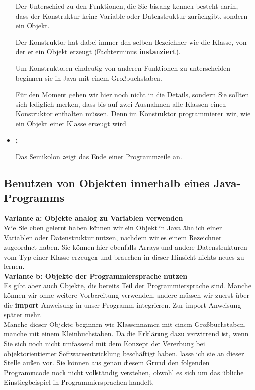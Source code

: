 \begin{itemize}
	Der Unterschied zu den Funktionen, die Sie bislang kennen besteht darin, dass der Konstruktur keine Variable oder Datenstruktur zurückgibt, sondern ein Objekt.
	
	Der Konstruktor hat dabei immer den selben Bezeichner wie die Klasse, von der er ein Objekt erzeugt (Fachterminus \textbf{instanziert}).
	
	Um Konstruktoren eindeutig von anderen Funktionen zu unterscheiden beginnen sie in Java mit einem Großbuchstaben.
	
	Für den Moment gehen wir hier noch nicht in die Details, sondern Sie sollten sich lediglich merken, dass bis auf zwei Ausnahmen alle Klassen einen Konstruktor enthalten müssen. Denn im Konstruktor programmieren wir, wie ein Objekt einer Klasse erzeugt wird.
	
	\item \textbf{;}
	
	Das Semikolon zeigt das Ende einer Programmzeile an.
\end{itemize}

\subsection{Benutzen von Objekten innerhalb eines Java-Programms}

\textbf{Variante a: Objekte analog zu Variablen verwenden}\\

Wie Sie oben gelernt haben können wir ein Objekt in Java ähnlich einer Variablen oder Datenstruktur nutzen, nachdem wir es einem Bezeichner zugeordnet haben. Sie können hier ebenfalls Arrays und andere Datenstrukturen vom Typ einer Klasse erzeugen und brauchen in dieser Hinsicht nichts neues zu lernen.\\

\textbf{Variante b: Objekte der Programmiersprache nutzen}\\

Es gibt aber auch Objekte, die bereits Teil der Programmiersprache sind. Manche können wir ohne weitere Vorbereitung verwenden, andere müssen wir zuerst über die \textbf{import}-Anweisung in unser Programm integrieren. Zur import-Anweisung später mehr.\\

Manche dieser Objekte beginnen wie Klassennamen mit einem Großbuchstaben, manche mit einem Kleinbuchstaben. Da die Erklärung dazu verwirrend ist, wenn Sie sich noch nicht umfassend mit dem Konzept der Vererbung bei objektorientierter Softwareentwicklung beschäftigt haben, lasse ich sie an dieser Stelle außen vor. Sie können aus genau diesem Grund den folgenden Programmcode noch nicht vollständig verstehen, obwohl es sich um das übliche Einstiegbeispiel in Programmiersprachen handelt.

